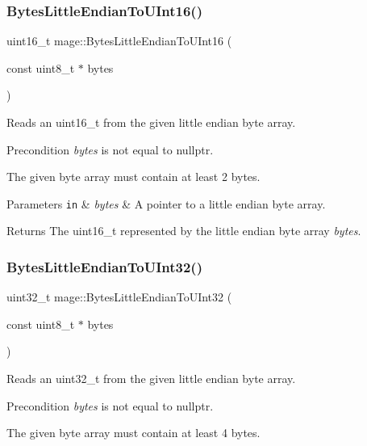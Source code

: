 \subsubsection{\texorpdfstring{Bytes\+Little\+Endian\+To\+U\+Int16()}{BytesLittleEndianToUInt16()}}
{\footnotesize\ttfamily uint16\+\_\+t mage\+::\+Bytes\+Little\+Endian\+To\+U\+Int16 (\begin{DoxyParamCaption}\item[{const uint8\+\_\+t $\ast$}]{bytes }\end{DoxyParamCaption})}

Reads an uint16\+\_\+t from the given little endian byte array.

\begin{DoxyPrecond}{Precondition}
{\itshape bytes} is not equal to {\ttfamily nullptr}. 

The given byte array must contain at least 2 bytes. 
\end{DoxyPrecond}

\begin{DoxyParams}[1]{Parameters}
\mbox{\tt in}  & {\em bytes} & A pointer to a little endian byte array. \\
\hline
\end{DoxyParams}
\begin{DoxyReturn}{Returns}
The {\ttfamily uint16\+\_\+t} represented by the little endian byte array {\itshape bytes}. 
\end{DoxyReturn}
\hypertarget{namespacemage_a453e851f136573bfc7839157786472a4}{}\label{namespacemage_a453e851f136573bfc7839157786472a4} 
\subsubsection{\texorpdfstring{Bytes\+Little\+Endian\+To\+U\+Int32()}{BytesLittleEndianToUInt32()}}
{\footnotesize\ttfamily uint32\+\_\+t mage\+::\+Bytes\+Little\+Endian\+To\+U\+Int32 (\begin{DoxyParamCaption}\item[{const uint8\+\_\+t $\ast$}]{bytes }\end{DoxyParamCaption})}

Reads an uint32\+\_\+t from the given little endian byte array.

\begin{DoxyPrecond}{Precondition}
{\itshape bytes} is not equal to {\ttfamily nullptr}. 

The given byte array must contain at least 4 bytes. 
\end{DoxyPrecond}

